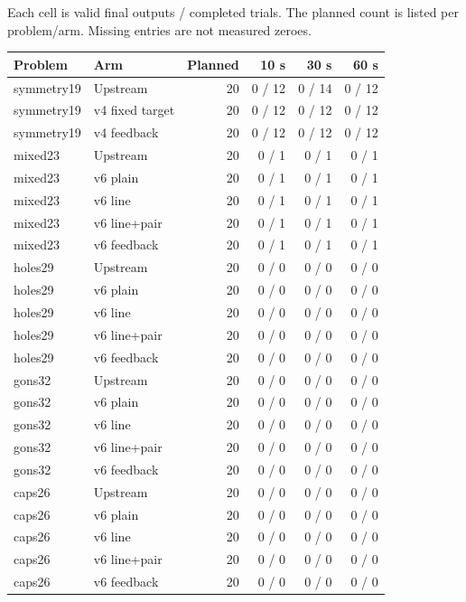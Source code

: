 \documentclass[10pt,a4paper]{article}
\begin{document}
Each cell is valid final outputs / completed trials. The planned count is listed per problem/arm. Missing entries are not measured zeroes.

\begin{center}\small\begin{longtable}{llrrrr}
\toprule
Problem & Arm & Planned & 10 s & 30 s & 60 s \\
\midrule\endhead
symmetry19 & Upstream & 20 & 0 / 12 & 0 / 14 & 0 / 12 \\
symmetry19 & v4 fixed target & 20 & 0 / 12 & 0 / 12 & 0 / 12 \\
symmetry19 & v4 feedback & 20 & 0 / 12 & 0 / 12 & 0 / 12 \\
mixed23 & Upstream & 20 & 0 / 1 & 0 / 1 & 0 / 1 \\
mixed23 & v6 plain & 20 & 0 / 1 & 0 / 1 & 0 / 1 \\
mixed23 & v6 line & 20 & 0 / 1 & 0 / 1 & 0 / 1 \\
mixed23 & v6 line+pair & 20 & 0 / 1 & 0 / 1 & 0 / 1 \\
mixed23 & v6 feedback & 20 & 0 / 1 & 0 / 1 & 0 / 1 \\
holes29 & Upstream & 20 & 0 / 0 & 0 / 0 & 0 / 0 \\
holes29 & v6 plain & 20 & 0 / 0 & 0 / 0 & 0 / 0 \\
holes29 & v6 line & 20 & 0 / 0 & 0 / 0 & 0 / 0 \\
holes29 & v6 line+pair & 20 & 0 / 0 & 0 / 0 & 0 / 0 \\
holes29 & v6 feedback & 20 & 0 / 0 & 0 / 0 & 0 / 0 \\
gons32 & Upstream & 20 & 0 / 0 & 0 / 0 & 0 / 0 \\
gons32 & v6 plain & 20 & 0 / 0 & 0 / 0 & 0 / 0 \\
gons32 & v6 line & 20 & 0 / 0 & 0 / 0 & 0 / 0 \\
gons32 & v6 line+pair & 20 & 0 / 0 & 0 / 0 & 0 / 0 \\
gons32 & v6 feedback & 20 & 0 / 0 & 0 / 0 & 0 / 0 \\
caps26 & Upstream & 20 & 0 / 0 & 0 / 0 & 0 / 0 \\
caps26 & v6 plain & 20 & 0 / 0 & 0 / 0 & 0 / 0 \\
caps26 & v6 line & 20 & 0 / 0 & 0 / 0 & 0 / 0 \\
caps26 & v6 line+pair & 20 & 0 / 0 & 0 / 0 & 0 / 0 \\
caps26 & v6 feedback & 20 & 0 / 0 & 0 / 0 & 0 / 0 \\
\bottomrule\end{longtable}\end{center}
\end{document}
